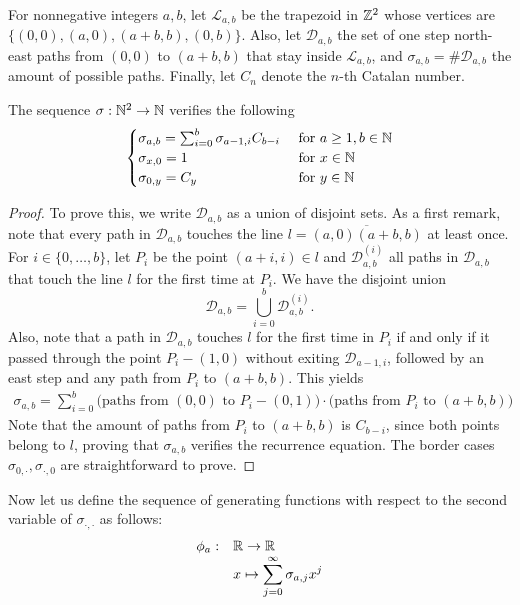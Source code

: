 For nonnegative integers $a,b$, let $\mathcal L_{a,b}$ be the trapezoid in $\mathbb{Z}^2$ whose vertices are
$\{(0,0),(a,0),(a+b,b),(0,b)\}.$ Also, let $\mathcal D_{a,b}$ the set of one step north-east paths from $(0,0)$ to $(a+b,b)$ that stay inside $\mathcal L_{a,b}$, and $\sigma_{a,b}=\# \mathcal D_{a,b}$ the amount of possible paths. Finally, let $C_n$ denote the $n$-th Catalan number. 
\begin{myprop*}
The sequence $\sigma:\mathbb{N}^2\to \mathbb{N}$ verifies the following
$$\begin{cases}
\sigma_{a,b}=\sum_{i=0}^b\sigma_{a-1,i}C_{b-i}& \mbox{ for }a\geq 1,b\in \mathbb{N}\\
\sigma_{x,0}=1 & \mbox{ for }x\in \mathbb{N}\\
\sigma_{0,y}=C_y & \mbox{ for }y\in \mathbb{N}
\end{cases}$$
\end{myprop*}
\begin{proof}
To prove this, we write $\mathcal D_{a,b}$ as a union of disjoint sets. As a first remark, note that every path in $\mathcal D_{a,b}$ touches the line $l=\overline{(a,0)(a+b,b)}$ at least once. For $i\in \{0,\dots,b\}$, let $P_i$ be the point $(a+i,i)\in l$ and $\mathcal D_{a,b}^{(i)}$ all paths in $\mathcal D_{a,b}$ that touch the line $l$ for the first time at $P_i$. We have the disjoint union
$$\mathcal D_{a,b}=\bigcup_{i=0}^b \mathcal D_{a,b}^{(i)}.$$
Also, note that a path in $\mathcal D_{a,b}$ touches $l$ for the first time in $P_i$ if and only if it passed through the point $P_i-(1,0)$ without exiting $\mathcal D_{a-1,i}$, followed by an east step and any path from $P_i$ to $(a+b,b)$. This yields
\begin{eqnarray*}
\sigma_{a,b}=\sum_{i=0}^{b}\mbox{(paths from $(0,0)$ to $P_i-(0,1))$}\cdot \mbox{(paths from $P_i$ to $(a+b,b))$}
\end{eqnarray*}
Note that the amount of paths from $P_i$ to $(a+b,b)$ is $C_{b-i}$, since both points belong to $l$, proving that $\sigma_{a,b}$ verifies the recurrence equation. The border cases $\sigma_{0,\cdot},\sigma_{\cdot,0}$ are straightforward to prove.
\end{proof}

Now let us define the sequence of generating functions with respect to the second variable of $\sigma_{\cdot,\cdot}$ as follows:
$$\begin{array}{cl}
\phi_a:&\mathbb{R}\to \mathbb{R}\\
       &x\mapsto \displaystyle \sum_{j=0}^{\infty}\sigma_{a,j}x^j
\end{array}$$
 
